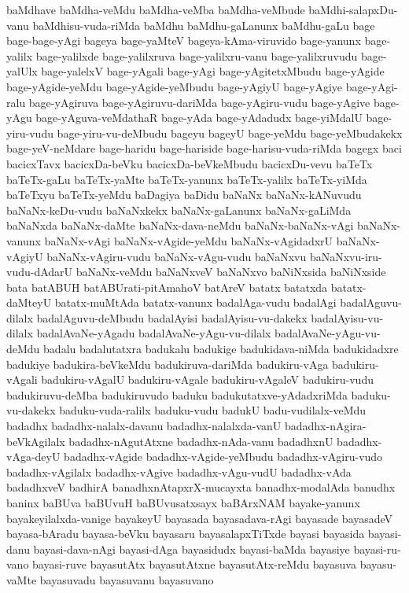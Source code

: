 {baMdhave
baMdha-veMdu
baMdha-veMba
baMdha-veMbude
baMdhi-salapxDu-vanu
baMdhisu-vuda-riMda
baMdhu
baMdhu-gaLanunx
baMdhu-gaLu
bage
bage-bage-yAgi
bageya
bage-yaMteV
bageya-kAma-viruvido
bage-yanunx
bage-yalilx
bage-yalilxde
bage-yalilxruva
bage-yalilxru-vanu
bage-yalilxruvudu
bage-yalUlx
bage-yalelxV
bage-yAgali
bage-yAgi
bage-yAgitetxMbudu
bage-yAgide
bage-yAgide-yeMdu
bage-yAgide-yeMbudu
bage-yAgiyU
bage-yAgiye
bage-yAgi-ralu
bage-yAgiruva
bage-yAgiruvu-dariMda
bage-yAgiru-vudu
bage-yAgive
bage-yAgu
bage-yAguva-veMdathaR
bage-yAda
bage-yAdadudx
bage-yiMdalU
bage-yiru-vudu
bage-yiru-vu-deMbudu
bageyu
bageyU
bage-yeMdu
bage-yeMbudakekx
bage-yeV-neMdare
bage-haridu
bage-hariside
bage-harisu-vuda-riMda
bagegx
baci
bacicxTavx
bacicxDa-beVku
bacicxDa-beVkeMbudu
bacicxDu-vevu
baTeTx
baTeTx-gaLu
baTeTx-yaMte
baTeTx-yanunx
baTeTx-yalilx
baTeTx-yiMda
baTeTxyu
baTeTx-yeMdu
baDagiya
baDidu
baNaNx
baNaNx-kANuvudu
baNaNx-keDu-vudu
baNaNxkekx
baNaNx-gaLanunx
baNaNx-gaLiMda
baNaNxda
baNaNx-daMte
baNaNx-dava-neMdu
baNaNx-baNaNx-vAgi
baNaNx-vanunx
baNaNx-vAgi
baNaNx-vAgide-yeMdu
baNaNx-vAgidadxrU
baNaNx-vAgiyU
baNaNx-vAgiru-vudu
baNaNx-vAgu-vudu
baNaNxvu
baNaNxvu-iru-vudu-dAdarU
baNaNx-veMdu
baNaNxveV
baNaNxvo
baNiNxsida
baNiNxside
bata
batABUH
batABUrati-pitAmahoV
batAreV
batatx
batatxda
batatx-daMteyU
batatx-muMtAda
batatx-vanunx
badalAga-vudu
badalAgi
badalAguvu-dilalx
badalAguvu-deMbudu
badalAyisi
badalAyisu-vu-dakekx
badalAyisu-vu-dilalx
badalAvaNe-yAgadu
badalAvaNe-yAgu-vu-dilalx
badalAvaNe-yAgu-vu-deMdu
badalu
badalutatxra
badukalu
badukige
badukidava-niMda
badukidadxre
badukiye
badukira-beVkeMdu
badukiruva-dariMda
badukiru-vAga
badukiru-vAgali
badukiru-vAgalU
badukiru-vAgale
badukiru-vAgaleV
badukiru-vudu
badukiruvu-deMba
badukiruvudo
baduku
badukutatxve-yAdadxriMda
baduku-vu-dakekx
baduku-vuda-ralilx
baduku-vudu
badukU
badu-vudilalx-veMdu
badadhx
badadhx-nalalx-davanu
badadhx-nalalxda-vanU
badadhx-nAgira-beVkAgilalx
badadhx-nAgutAtxne
badadhx-nAda-vanu
badadhxnU
badadhx-vAga-deyU
badadhx-vAgide
badadhx-vAgide-yeMbudu
badadhx-vAgiru-vudo
badadhx-vAgilalx
badadhx-vAgive
badadhx-vAgu-vudU
badadhx-vAda
badadhxveV
badhirA
banadhxnAtapxrX-mucayxta
banadhx-modalAda
banudhx
baninx
baBUva
baBUvuH
baBUvusatxsayx
baBArxNAM
bayake-yanunx
bayakeyilalxda-vanige
bayakeyU
bayasada
bayasadava-rAgi
bayasade
bayasadeV
bayasa-bAradu
bayasa-beVku
bayasaru
bayasalapxTiTxde
bayasi
bayasida
bayasi-danu
bayasi-dava-nAgi
bayasi-dAga
bayasidudx
bayasi-baMda
bayasiye
bayasi-ru-vano
bayasi-ruve
bayasutAtx
bayasutAtxne
bayasutAtx-reMdu
bayasuva
bayasu-vaMte
bayasuvadu
bayasuvanu
bayasuvano
}
